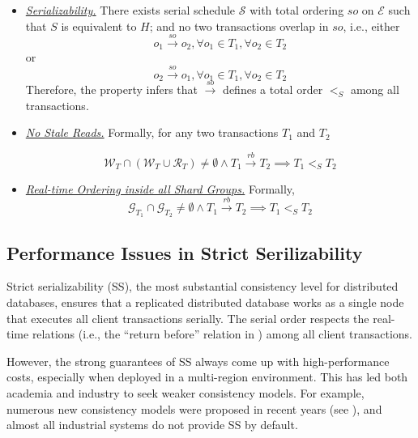 \begin{itemize}[leftmargin=*, itemsep=1.5pt]
    \setlength{\itemsep}{0pt}
    \setlength{\parsep}{0pt}
    \setlength{\parskip}{0pt}
\item \textit{\underline{Serializability.}} There exists serial schedule $\mathcal{S}$ with total ordering $so$ on $\mathcal{E}$ such that 
$S$ is equivalent to $H$; and  no two transactions overlap in $so$, i.e., either 
    \vspace{2pt}
$$o_1 \xrightarrow{so} o_2,  \forall o_1 \in T_1, \forall o_2 \in T_2$$ or 
$$o_2 \xrightarrow{so} o_1,  \forall o_1 \in T_1, \forall o_2 \in T_2$$
    \vspace{2pt}
Therefore, the property  infers that $\xrightarrow{so}$ defines a total order $<_S$ among all transactions.

    \vspace{2pt}
\item \textit{\underline{No Stale Reads.}} Formally, for any two transactions $T_1$ and $T_2$

$$ \mathcal{W}_T \cap (\mathcal{W}_T \cup \mathcal{R}_T) \neq \emptyset \land T_1 \xrightarrow{rb} T_2 \implies T_1 <_S T_2$$

    \vspace{2pt}
\item \textit{\underline{Real-time Ordering inside all Shard Groups.}} Formally,
$$\mathcal{G}_{T_1} \cap \mathcal{G}_{T_2} \neq \emptyset \land T_1 \xrightarrow{rb} T_2 \implies T_1 <_S T_2$$
\end{itemize}




\subsection{Performance Issues in Strict Serilizability}\label{sec:rls:issue}

Strict serializability (SS), the most substantial consistency level for distributed databases, ensures that a replicated distributed database works as a single node that executes all client transactions serially. The serial order respects the real-time relations (i.e., the ``return before'' relation in ) among all client transactions. 

However, the strong guarantees of SS always come up with high-performance costs, especially when deployed in a multi-region environment. This has led both academia and industry to seek weaker consistency models. For example, numerous new consistency models were proposed in recent years (see ), and almost all industrial systems do not provide SS by default.

